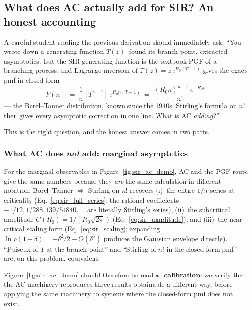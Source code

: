 \documentclass[11pt,a4paper]{article}
\theoremstyle{definition}
\begin{document}
\subsection{What does AC actually add for SIR? An honest accounting}
\label{sec:sir_honest}

A careful student reading the previous derivation should immediately ask:
``You wrote down a generating function $T(z)$, found its branch point,
extracted asymptotics. But the SIR generating function is the textbook
PGF of a branching process, and Lagrange inversion of $T(z)=z\,e^{R_0(T-1)}$
gives the exact pmf in closed form
\[
P(n) \;=\; \frac{1}{n}[T^{n-1}]\, e^{R_0 n (T-1)}
\;=\; \frac{(R_0 n)^{n-1}\, e^{-R_0 n}}{n!}
\]
--- the Borel--Tanner distribution, known since the 1940s. Stirling's
formula on $n!$ then gives every asymptotic correction in one line.
What is AC \emph{adding}?''

This is the right question, and the honest answer comes in two parts.

\subsubsection*{What AC does \emph{not} add: marginal asymptotics}

For the marginal observables in Figure~\ref{fig:sir_ac_demo}, AC and
the PGF route give the same numbers because they \emph{are} the same
calculation in different notation. Borel--Tanner $\Rightarrow$ Stirling
on $n!$ recovers (i)~the entire $1/n$ series at criticality
(Eq.~\eqref{eq:sir_full_series}; the rational coefficients
$-1/12, 1/288, 139/51840, \ldots$ are literally Stirling's series),
(ii)~the subcritical amplitude $C(R_0)=1/(R_0\sqrt{2\pi})$
(Eq.~\eqref{eq:sir_amplitude}), and (iii)~the near-critical scaling
form (Eq.~\eqref{eq:sir_scaling}; expanding $\ln\rho(1{-}\delta)
=-\delta^2/2-O(\delta^3)$ produces the Gaussian envelope directly).
``Puiseux of $T$ at the branch point'' and ``Stirling of $n!$ in the
closed-form pmf'' are, on this problem, equivalent.

Figure~\ref{fig:sir_ac_demo} should therefore be read as
\textbf{calibration}: we verify that the AC machinery reproduces three
results obtainable a different way, before applying the same machinery
to systems where the closed-form pmf does not exist.
\end{document}
